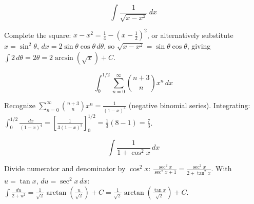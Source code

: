 \begin{questions}
\question
\[\int \frac{1}{\sqrt{x-x^2}}\,dx\]
\begin{solution}
Complete the square: $x-x^2 = \frac14-\left(x-\frac12\right)^2$, or alternatively substitute $x=\sin^2\theta$, $dx=2\sin\theta\cos\theta\,d\theta$, so $\sqrt{x-x^2}=\sin\theta\cos\theta$, giving $\int 2\,d\theta = 2\theta = 2\arcsin(\sqrt x)+C$.
\end{solution}

\question
\[\int_0^{1/2}\sum_{n=0}^{\infty}\binom{n+3}{n}x^n\,dx\]
\begin{solution}
Recognize $\sum_{n=0}^\infty\binom{n+3}{n}x^n = \frac{1}{(1-x)^4}$ (negative binomial series). Integrating: $\int_0^{1/2}\frac{dx}{(1-x)^4} = \left[\frac{1}{3(1-x)^3}\right]_0^{1/2} = \frac{1}{3}(8-1)=\frac73$.
\end{solution}

\question
\[\int \frac{1}{1+\cos^2x}\,dx\]
\begin{solution}
Divide numerator and denominator by $\cos^2x$: $\frac{\sec^2x}{\sec^2x+1} = \frac{\sec^2x}{2+\tan^2x}$. With $u=\tan x$, $du=\sec^2x\,dx$: $\int\frac{du}{2+u^2} = \frac{1}{\sqrt2}\arctan\left(\frac{u}{\sqrt2}\right)+C = \frac{1}{\sqrt2}\arctan\left(\frac{\tan x}{\sqrt2}\right)+C$.
\end{solution}

\end{questions}

